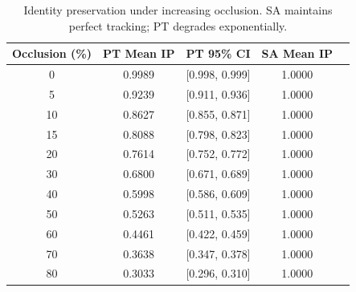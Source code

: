 \begin{table}[t]
\centering
\caption{Identity preservation under increasing occlusion. SA maintains perfect tracking; PT degrades exponentially.}
\label{tab:occlusion}
\begin{tabular}{ccccc}
\toprule
Occlusion (\%) & PT Mean IP & PT 95\% CI & SA Mean IP \\
\midrule
0 & 0.9989 & [0.998, 0.999] & 1.0000 \\
5 & 0.9239 & [0.911, 0.936] & 1.0000 \\
10 & 0.8627 & [0.855, 0.871] & 1.0000 \\
15 & 0.8088 & [0.798, 0.823] & 1.0000 \\
20 & 0.7614 & [0.752, 0.772] & 1.0000 \\
30 & 0.6800 & [0.671, 0.689] & 1.0000 \\
40 & 0.5998 & [0.586, 0.609] & 1.0000 \\
50 & 0.5263 & [0.511, 0.535] & 1.0000 \\
60 & 0.4461 & [0.422, 0.459] & 1.0000 \\
70 & 0.3638 & [0.347, 0.378] & 1.0000 \\
80 & 0.3033 & [0.296, 0.310] & 1.0000 \\
\bottomrule
\end{tabular}
\end{table}